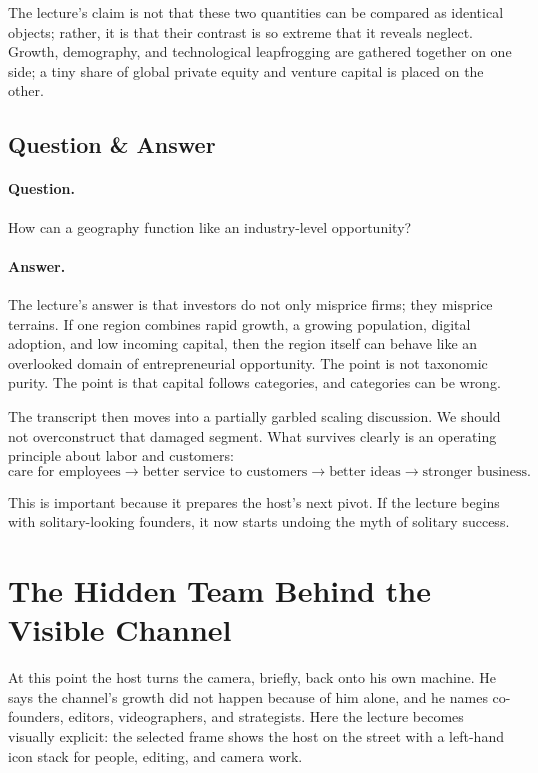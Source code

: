 The lecture's claim is not that these two quantities can be compared as identical objects; rather, it is that their contrast is so extreme that it reveals neglect. Growth, demography, and technological leapfrogging are gathered together on one side; a tiny share of global private equity and venture capital is placed on the other.

\subsection{Question \& Answer}

\paragraph{Question.} How can a geography function like an industry-level opportunity?

\paragraph{Answer.} The lecture's answer is that investors do not only misprice firms; they misprice terrains. If one region combines rapid growth, a growing population, digital adoption, and low incoming capital, then the region itself can behave like an overlooked domain of entrepreneurial opportunity. The point is not taxonomic purity. The point is that capital follows categories, and categories can be wrong.

The transcript then moves into a partially garbled scaling discussion. We should not overconstruct that damaged segment. What survives clearly is an operating principle about labor and customers:
\begin{equation}
\text{care for employees}
\to
\text{better service to customers}
\to
\text{better ideas}
\to
\text{stronger business}.
\end{equation}

This is important because it prepares the host's next pivot. If the lecture begins with solitary-looking founders, it now starts undoing the myth of solitary success.

\section{The Hidden Team Behind the Visible Channel}

At this point the host turns the camera, briefly, back onto his own machine. He says the channel's growth did not happen because of him alone, and he names co-founders, editors, videographers, and strategists. Here the lecture becomes visually explicit: the selected frame shows the host on the street with a left-hand icon stack for people, editing, and camera work.

